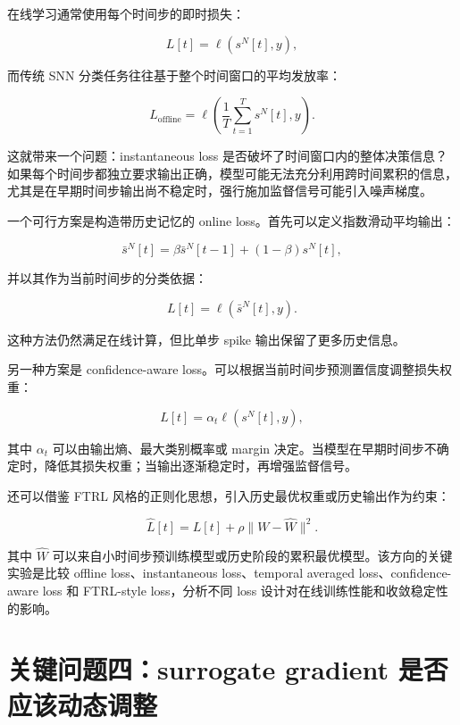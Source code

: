 \documentclass[11pt]{ctexart}
\begin{document}
在线学习通常使用每个时间步的即时损失：

\begin{equation}
L[t] = \ell(s^N[t], y),
\end{equation}

而传统 SNN 分类任务往往基于整个时间窗口的平均发放率：

\begin{equation}
L_{\mathrm{offline}}
=
\ell\left(\frac{1}{T}\sum_{t=1}^{T}s^N[t], y\right).
\end{equation}

这就带来一个问题：instantaneous loss 是否破坏了时间窗口内的整体决策信息？如果每个时间步都独立要求输出正确，模型可能无法充分利用跨时间累积的信息，尤其是在早期时间步输出尚不稳定时，强行施加监督信号可能引入噪声梯度。

一个可行方案是构造带历史记忆的 online loss。首先可以定义指数滑动平均输出：

\begin{equation}
\bar{s}^N[t]
=
\beta \bar{s}^N[t-1]
+(1-\beta)s^N[t],
\end{equation}

并以其作为当前时间步的分类依据：

\begin{equation}
L[t] = \ell(\bar{s}^N[t],y).
\end{equation}

这种方法仍然满足在线计算，但比单步 spike 输出保留了更多历史信息。

另一种方案是 confidence-aware loss。可以根据当前时间步预测置信度调整损失权重：

\begin{equation}
L[t]=\alpha_t\ell(s^N[t],y),
\end{equation}

其中 $\alpha_t$ 可以由输出熵、最大类别概率或 margin 决定。当模型在早期时间步不确定时，降低其损失权重；当输出逐渐稳定时，再增强监督信号。

还可以借鉴 FTRL 风格的正则化思想，引入历史最优权重或历史输出作为约束：

\begin{equation}
\hat L[t]
=
L[t]
+
\rho\|W-\hat W\|^2 .
\end{equation}

其中 $\hat W$ 可以来自小时间步预训练模型或历史阶段的累积最优模型。该方向的关键实验是比较 offline loss、instantaneous loss、temporal averaged loss、confidence-aware loss 和 FTRL-style loss，分析不同 loss 设计对在线训练性能和收敛稳定性的影响。

\section{关键问题四：surrogate gradient 是否应该动态调整}
\end{document}
